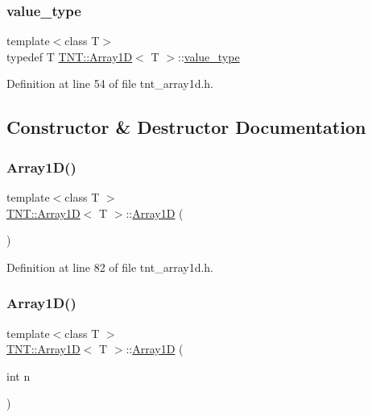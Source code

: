 \subsubsection{\texorpdfstring{value\+\_\+type}{value\_type}}
{\footnotesize\ttfamily template$<$class T$>$ \\
typedef T \hyperlink{classTNT_1_1Array1D}{T\+N\+T\+::\+Array1D}$<$ T $>$\+::\hyperlink{classTNT_1_1Array1D_aa33efada6a804a1b32da0e315baeb29c}{value\+\_\+type}}



Definition at line 54 of file tnt\+\_\+array1d.\+h.



\subsection{Constructor \& Destructor Documentation}
\mbox{\label{classTNT_1_1Array1D_a63efd23cd38d37d427702d5e1d2b23d3}} 
\subsubsection{\texorpdfstring{Array1\+D()}{Array1D()}\hspace{0.1cm}{\footnotesize\ttfamily [1/5]}}
{\footnotesize\ttfamily template$<$class T $>$ \\
\hyperlink{classTNT_1_1Array1D}{T\+N\+T\+::\+Array1D}$<$ T $>$\+::\hyperlink{classTNT_1_1Array1D}{Array1D} (\begin{DoxyParamCaption}{ }\end{DoxyParamCaption})}



Definition at line 82 of file tnt\+\_\+array1d.\+h.

\mbox{\label{classTNT_1_1Array1D_a97139e0062704ec12f76c51a4f8527f1}} 
\subsubsection{\texorpdfstring{Array1\+D()}{Array1D()}\hspace{0.1cm}{\footnotesize\ttfamily [2/5]}}
{\footnotesize\ttfamily template$<$class T $>$ \\
\hyperlink{classTNT_1_1Array1D}{T\+N\+T\+::\+Array1D}$<$ T $>$\+::\hyperlink{classTNT_1_1Array1D}{Array1D} (\begin{DoxyParamCaption}\item[{int}]{n }\end{DoxyParamCaption})\hspace{0.3cm}{\ttfamily [explicit]}}



